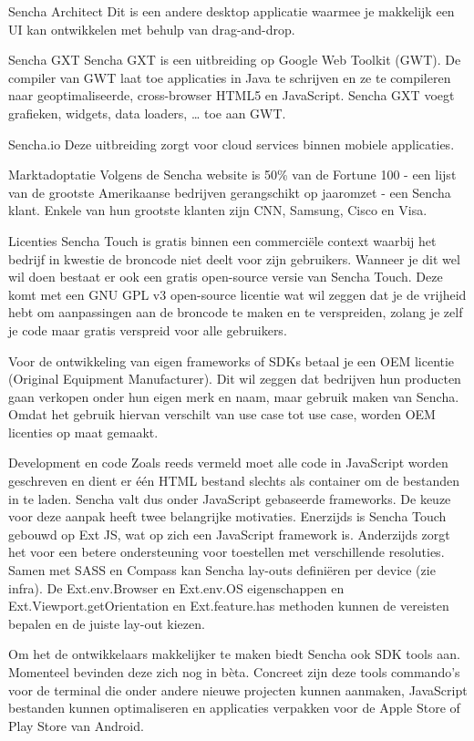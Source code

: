 Sencha Architect
Dit is een andere desktop applicatie waarmee je makkelijk een UI kan ontwikkelen met behulp van drag-and-drop.  

Sencha GXT
Sencha GXT is een uitbreiding op Google Web Toolkit (GWT).  De compiler van GWT laat toe applicaties in Java te schrijven en ze te compileren naar geoptimaliseerde,  cross-browser HTML5 en JavaScript.  Sencha GXT voegt grafieken,  widgets,  data loaders, … toe aan GWT.

Sencha.io
Deze uitbreiding zorgt voor cloud services binnen mobiele applicaties.  

Marktadoptatie
Volgens de Sencha website is 50\% van de Fortune 100 - een lijst van de grootste Amerikaanse bedrijven gerangschikt op jaaromzet - een Sencha klant.  Enkele van hun grootste klanten zijn CNN,  Samsung,  Cisco en  Visa.

Licenties
Sencha Touch is gratis binnen een commerciële context waarbij het bedrijf in kwestie de broncode niet deelt voor zijn gebruikers.  Wanneer je dit wel wil doen bestaat er ook een gratis open-source versie van Sencha Touch.  Deze komt met een GNU GPL v3 open-source licentie wat wil zeggen dat je de vrijheid hebt om aanpassingen aan de broncode te maken en te verspreiden,  zolang je zelf je code maar gratis verspreid voor alle gebruikers.
  
Voor de ontwikkeling van eigen frameworks of SDKs betaal je een OEM licentie (Original Equipment Manufacturer).  Dit wil zeggen dat bedrijven hun producten gaan verkopen onder hun eigen merk en naam, maar gebruik maken van Sencha.  Omdat het gebruik hiervan verschilt van use case tot use case,  worden OEM licenties op maat gemaakt.

Development en code
Zoals reeds vermeld moet alle code in JavaScript worden geschreven en dient er één HTML bestand slechts als container om de bestanden in te laden.  Sencha valt dus onder JavaScript gebaseerde frameworks.  De keuze voor deze aanpak heeft twee belangrijke motivaties.  Enerzijds is Sencha Touch gebouwd op Ext JS,  wat op zich een JavaScript framework is.  Anderzijds zorgt het voor een betere ondersteuning voor toestellen met verschillende resoluties.  Samen met SASS en Compass kan Sencha lay-outs definiëren per device (zie infra).  De Ext.env.Browser en Ext.env.OS eigenschappen en Ext.Viewport.getOrientation en Ext.feature.has methoden kunnen de vereisten bepalen en de juiste lay-out kiezen.

Om het de ontwikkelaars makkelijker te maken biedt Sencha ook SDK tools aan.  Momenteel bevinden deze zich nog in bèta.  Concreet zijn deze tools commando's voor de terminal die onder andere nieuwe projecten kunnen aanmaken, JavaScript bestanden kunnen optimaliseren en applicaties verpakken voor de Apple Store of Play Store van Android.  

